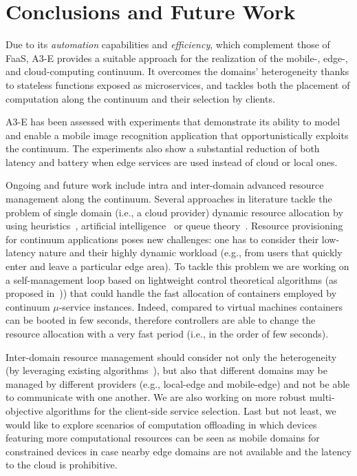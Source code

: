 \section{Conclusions and Future Work}\label{sec:conclusions}

Due to its \textit{automation} capabilities and \textit{efficiency}, which complement those of FaaS, A3-E provides a suitable approach for the realization of the mobile-, edge-, and cloud-computing continuum. It overcomes the domains' heterogeneity thanks to stateless functions exposed as microservices, and tackles both the placement of computation along the continuum and their selection by clients.

A3-E has been assessed with experiments that demonstrate its ability to model and enable a mobile image recognition application that opportunistically exploits the continuum. The experiments also show a substantial reduction of both latency and battery when edge services are used instead of cloud or local ones. 

Ongoing and future work include intra and inter-domain advanced resource management along the continuum. 
Several approaches in literature tackle the problem of single domain (i.e., a cloud provider) dynamic resource allocation by using heuristics~\cite{dustdar0}, artificial intelligence~\cite{ia1} or queue theory~\cite{queue1}. 
Resource provisioning for continuum applications poses new challenges: one has to consider their low-latency nature and their highly dynamic workload (e.g., from users that quickly enter and leave a particular edge area). To tackle this problem we are working on a self-management loop based on lightweight control theoretical algorithms (as proposed in~\cite{Quatrocchi2016discrete})) that could handle the fast allocation of containers employed by continuum $\mu$-service instances. Indeed, compared to virtual machines containers can be booted in few seconds, therefore controllers are able to change the resource allocation with a very fast period (i.e., in the order of few seconds). 

Inter-domain resource management should consider not only the heterogeneity (by leveraging existing algorithms~\cite{Tarneberg2017}), but also that different domains may be managed by different providers (e.g., local-edge and mobile-edge) and not be able to communicate with one another. We are also working on more robust multi-objective algorithms for the client-side service selection. 
Last but not least, 
we would like to explore scenarios of computation offloading in which devices featuring more computational resources can be seen as mobile domains for constrained devices in case nearby edge domains are not available and the latency to the cloud is prohibitive.